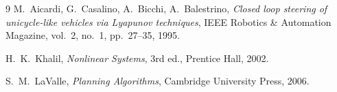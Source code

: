 \documentclass[12pt, a4paper]{article}
\theoremstyle{definition}
\theoremstyle{plain}
\begin{document}
\begin{thebibliography}{9}
  M.~Aicardi, G.~Casalino, A.~Bicchi, A.~Balestrino,
  \emph{Closed loop steering of unicycle-like vehicles via Lyapunov techniques},
  IEEE Robotics \& Automation Magazine, vol.~2, no.~1, pp.~27--35, 1995.

  H.~K.~Khalil,
  \emph{Nonlinear Systems}, 3rd ed., Prentice Hall, 2002.

  S.~M.~LaValle,
  \emph{Planning Algorithms}, Cambridge University Press, 2006.
\end{thebibliography}
\end{document}
